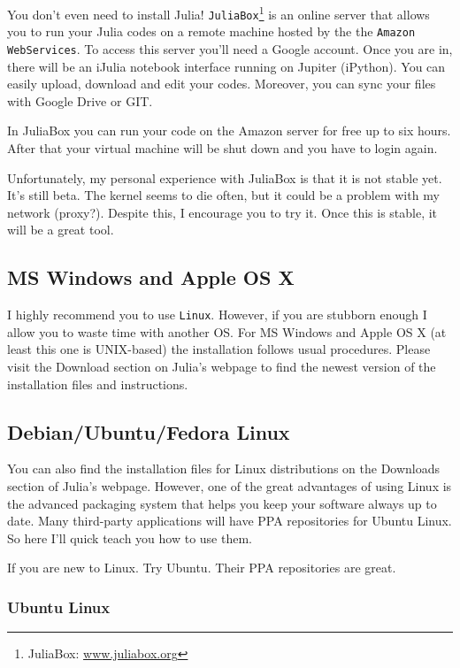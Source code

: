 You don't even need to install Julia! \texttt{JuliaBox}\footnote{JuliaBox: \url{www.juliabox.org}} is an online server that allows you to run your Julia codes on a remote machine hosted by the the \texttt{Amazon WebServices}. To access this server you'll need a Google account. Once you are in, there will be an iJulia notebook interface running on Jupiter (iPython). You can easily upload, download and edit your codes. Moreover, you can sync your files with Google Drive or GIT.

In JuliaBox you can run your code on the Amazon server for free up to six hours. After that your virtual machine will be shut down and you have to login again. 

Unfortunately, my personal experience with JuliaBox is that it is not stable yet. It's still beta. The kernel seems to die often, but it could be a problem with my network (proxy?). Despite this, I encourage you to try it. Once this is stable, it will be a great tool.


\subsection*{MS Windows and Apple OS X}

I highly recommend you to use \texttt{Linux}. However, if you are stubborn enough I allow you to waste time with another OS. For MS Windows and Apple OS X (at least this one is UNIX-based) the installation follows usual procedures. Please visit the Download section on Julia's webpage to find the newest version of the installation files and instructions.

\subsection*{Debian/Ubuntu/Fedora Linux}

You can also find the installation files for Linux distributions on the Downloads section of Julia's webpage. However, one of the great advantages of using Linux is the advanced packaging system that helps you keep your software always up to date. Many third-party applications will have PPA repositories for Ubuntu Linux. So here I'll quick teach you how to use them.

If you are new to Linux. Try Ubuntu. Their PPA repositories are great.

\subsubsection*{Ubuntu Linux}

